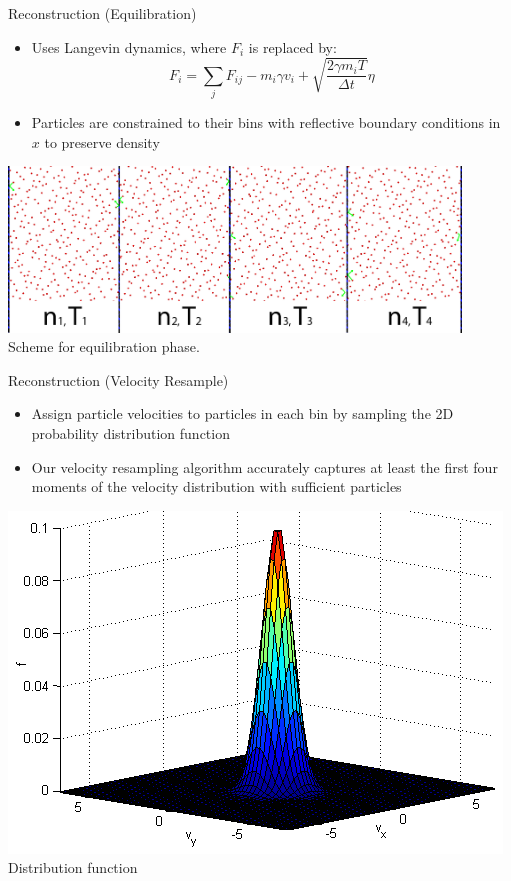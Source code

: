 \documentclass{beamer}
\begin{document}
	\begin{frame}{Reconstruction (Equilibration)}
		\begin{itemize}
			\item Uses Langevin dynamics, where $F_i$ is replaced by:
			\begin{equation*}
			F_i = \sum_{j}F_{ij} - m_i\gamma v_i + \sqrt{\frac{2\gamma m_iT}{\Delta t}}\eta
			\end{equation*}
			\item Particles are constrained to their bins with reflective boundary conditions in $x$ to preserve density
		\end{itemize}
		\begin{center}
			\includegraphics[width=0.9\textwidth]{figures/equilibration.png}
			\\\tiny Scheme for equilibration phase.
		\end{center}
	\end{frame}
	
	\begin{frame}{Reconstruction (Velocity Resample)}
		\begin{itemize}
			\item Assign particle velocities to particles in each bin by sampling the 2D probability distribution function
			\vspace{0.5em}
			\item Our velocity resampling algorithm accurately captures at least the first four moments of the velocity distribution with sufficient particles
			\vspace{0.5em}
		\end{itemize}
		\begin{center}
			\includegraphics[height=0.4\textheight]{example_f.png}
			\\\tiny Distribution function
		\end{center}
	\end{frame}
	
\end{document}
